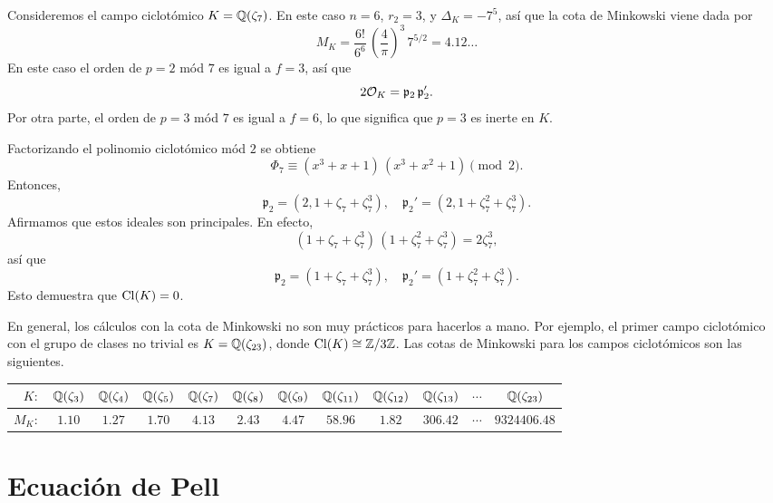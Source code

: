 \begin{ejemplo}
  Consideremos el campo ciclotómico $K = \mathbb{Q} (\zeta_7)$. En este caso
  $n = 6$, $r_2 = 3$, y $\Delta_K = -7^5$, así que la cota de Minkowski
  viene dada por
  $$M_K = \frac{6!}{6^6} \, \left(\frac{4}{\pi}\right)^3 \, 7^{5/2} = 4.12\ldots$$
  En este caso el orden de $p = 2$ mód $7$ es igual a $f = 3$, así que
  $$2\mathcal{O}_K = \mathfrak{p}_2 \, \mathfrak{p}_2'.$$
  Por otra parte, el orden de $p = 3$ mód $7$ es igual a $f = 6$, lo que
  significa que $p = 3$ es inerte en $K$.

  Factorizando el polinomio ciclotómico mód $2$ se obtiene
  $$\Phi_7 \equiv (x^3 + x + 1)\,(x^3 + x^2 + 1) \pmod{2}.$$
  Entonces,
  \[ \mathfrak{p}_2 = (2, 1 + \zeta_7 + \zeta_7^3), \quad
     \mathfrak{p}_2' = (2, 1 + \zeta_7^2 + \zeta_7^3). \]
  Afirmamos que estos ideales son principales. En efecto,
  $$(1 + \zeta_7 + \zeta_7^3)\,(1 + \zeta_7^2 + \zeta_7^3) = 2\zeta_7^3,$$
  así que
  \[ \mathfrak{p}_2 = (1 + \zeta_7 + \zeta_7^3), \quad
     \mathfrak{p}_2' = (1 + \zeta_7^2 + \zeta_7^3). \]
  Esto demuestra que $\operatorname{Cl} (K) = 0$.
\end{ejemplo}

\begin{comentario}
  En general, los cálculos con la cota de Minkowski no son muy prácticos para
  hacerlos a mano. Por ejemplo, el primer campo ciclotómico con el grupo de
  clases no trivial es $K = \mathbb{Q} (\zeta_{23})$, donde
  $\operatorname{Cl} (K) \cong \mathbb{Z}/3\mathbb{Z}$. Las cotas de Minkowski para los campos ciclotómicos
  son las siguientes.

  \begin{center}\renewcommand{\arraystretch}{1.5}
    \begin{tabular}{rccccccccccc}
      \hline
      $K\colon$ & $\mathbb{Q} (\zeta_3)$ & $\mathbb{Q} (\zeta_4)$ & $\mathbb{Q} (\zeta_5)$ & $\mathbb{Q} (\zeta_7)$ & $\mathbb{Q} (\zeta_8)$ & $\mathbb{Q} (\zeta_9)$ & $\mathbb{Q} (\zeta_{11})$ & $\mathbb{Q} (\zeta_{12})$ & $\mathbb{Q} (\zeta_{13})$ & $\cdots$ & $\mathbb{Q} (\zeta_{23})$ \tabularnewline
      \hline
      $M_K\colon$ & $1.10$ & $1.27$ & $1.70$ & $4.13$ & $2.43$ & $4.47$ & $58.96$ & $1.82$ & $306.42$ & $\cdots$ & $9324406.48$ \tabularnewline
      \hline
    \end{tabular}
  \end{center}
\end{comentario}


\section{Ecuación de Pell}

